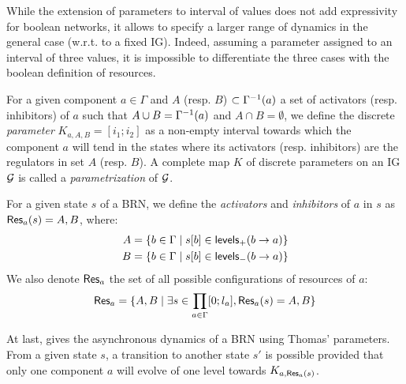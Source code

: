 While the extension of parameters to interval of values does not add expressivity for boolean
networks, it allows to specify a larger range of dynamics in the general case (w.r.t. to a fixed
IG).
Indeed, assuming a parameter assigned to an interval of three values, it is impossible to
differentiate the three cases with the boolean definition of resources.


\begin{definition}\label{def:param}
For a given component $a \in \Gamma$ and $A$ (resp. $B$) $\subset \Gamma^{-1}(a)$ a set of activators (resp. inhibitors) of $a$ such that
$A \cup B = \Gamma^{-1}(a)$ and $A \cap B = \emptyset$,
we define the discrete \emph{parameter} $K_{a,A,B} = [i_1; i_2]$ as a non-empty interval towards which the component $a$ will tend
in the states where its activators (resp. inhibitors) are the regulators in set $A$ (resp. $B$).
A complete map $K$ of discrete parameters on an IG $\mathcal{G}$ is called a \emph{parametrization} of $\mathcal{G}$.
\end{definition}

\begin{definition}\label{def:resources}
For a given state $s$ of a BRN, we define the \emph{activators} and \emph{inhibitors} of $a$ in $s$ as $\mathsf{Res}_{a}(s) = A,B$, where:
\begin{align*}
  A &= \{b \in \Gamma \mid {s[b]} \in \mathsf{levels}_+(b\rightarrow a)\} \\
  B &= \{b \in \Gamma \mid {s[b]} \in \mathsf{levels}_-(b\rightarrow a)\}
\end{align*}
We also denote $\mathsf{Res}_{a}$ the set of all possible configurations of resources of $a$:
\[\mathsf{Res}_{a} = \{A,B \mid \exists s \in \prod_{a \in \Gamma} [0;l_a], \mathsf{Res}_{a}(s) = A,B\}\]
\end{definition}


At last,  gives the asynchronous dynamics of a BRN using Thomas' parameters.
From a given state $s$, a transition to another state $s'$ is possible provided that only one component $a$ will evolve of one level towards $K_{a,\mathsf{Res}_{a}(s)}$.

